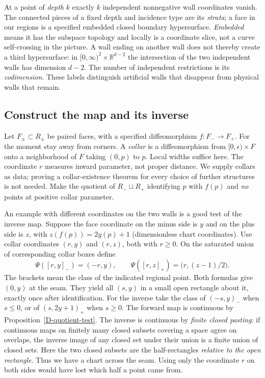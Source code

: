 At a point of \emph{depth} $k$ exactly $k$ independent nonnegative wall coordinates vanish. The connected pieces of a fixed depth and incidence type are its \emph{strata}; a face in our regions is a specified embedded closed boundary hypersurface. \emph{Embedded} means it has the subspace topology and locally is a coordinate slice, not a curve self-crossing in the picture. A wall ending on another wall does not thereby create a third hypersurface: in $[0,\infty)^2\times\mathbb R^{d-2}$ the intersection of the two independent walls has dimension $d-2$. The number of independent restrictions is its \emph{codimension}. These labels distinguish artificial walls that disappear from physical walls that remain.

\subsection{Construct the map and its inverse}
Let $F_\pm\subset R_\pm$ be paired faces, with a specified diffeomorphism $f:F_-\to F_+$. For the moment stay away from corners. A \emph{collar} is a diffeomorphism from $[0,\epsilon)\times F$ onto a neighborhood of $F$ taking $(0,p)$ to $p$. Local widths suffice here. The coordinate $r$ measures inward parameter, not proper distance. We supply collars as data; proving a collar-existence theorem for every choice of further structures is not needed. Make the quotient of $R_-\sqcup R_+$ identifying $p$ with $f(p)$ and \emph{no} points at positive collar parameter.

An example with different coordinates on the two walls is a good test of the inverse map. Suppose the face coordinate on the minus side is $y$ and on the plus side is $z$, with $z(f(p))=2y(p)+1$ (dimensionless chart coordinates). Use collar coordinates $(r,y)$ and $(r,z)$, both with $r\geq0$. On the saturated union of corresponding collar boxes define
\begin{equation}
 \Psi([r,y]_-)=(-r,y),\qquad
 \Psi([r,z]_+)=\big(r,(z-1)/2\big).
 \label{D-signed-chart}
\end{equation}
The brackets mean the class of the indicated regional point. Both formulas give $(0,y)$ at the seam. They yield all $(s,y)$ in a small open rectangle about it, exactly once after identification. For the inverse take the class of $(-s,y)_-$ when $s\leq0$, or of $(s,2y+1)_+$ when $s\geq0$. The forward map is continuous by Proposition~\ref{D-quotient-test}. The inverse is continuous by \emph{finite closed pasting}: if continuous maps on finitely many closed subsets covering a space agree on overlaps, the inverse image of any closed set under their union is a finite union of closed sets. Here the two closed subsets are the half-rectangles \emph{relative to the open rectangle}. Thus we have a chart across the seam. Using only the coordinate $r$ on both sides would have lost which half a point came from.


